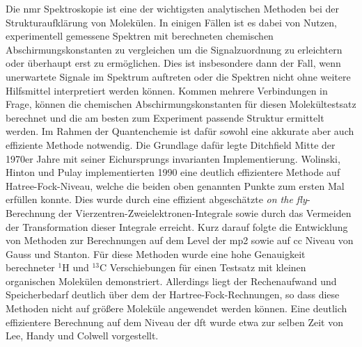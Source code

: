 Die \ac{nmr} Spektroskopie ist eine der wichtigsten analytischen Methoden bei der Strukturaufklärung von Molekülen. In einigen Fällen ist es dabei von Nutzen, experimentell gemessene Spektren mit berechneten chemischen Abschirmungskonstanten zu vergleichen um die Signalzuordnung zu erleichtern oder überhaupt erst zu ermöglichen. Dies ist insbesondere dann der Fall, wenn unerwartete Signale im Spektrum auftreten oder die Spektren nicht ohne weitere Hilfsmittel interpretiert werden können. Kommen mehrere Verbindungen in Frage, können die chemischen Abschirmungskonstanten für diesen Molekültestsatz berechnet und die am besten zum Experiment passende Struktur ermittelt werden. Im Rahmen der Quantenchemie ist dafür sowohl eine akkurate aber auch effiziente Methode notwendig. Die Grundlage dafür legte Ditchfield\supercite{ditchfield1974self} Mitte der 1970er Jahre mit seiner Eichursprungs invarianten Implementierung. Wolinski, Hinton und Pulay\supercite{wolinski1990efficient} implementierten 1990 eine deutlich effizientere Methode auf Hatree-Fock-Niveau, welche die beiden oben genannten Punkte zum ersten Mal erfüllen konnte. Dies wurde durch eine effizient abgeschätzte \glqq \textit{on the fly}\grqq{}-Berechnung der Vierzentren-Zweielektronen-Integrale sowie durch das Vermeiden der Transformation dieser Integrale erreicht. Kurz darauf folgte die Entwicklung von Methoden zur Berechnungen auf dem Level der \ac{mp2}\supercite{gauss1992calculation} sowie auf \ac{cc}\supercite{gauss1995gauge} Niveau von Gauss und Stanton. Für diese Methoden wurde eine hohe Genauigkeit berechneter $^1$H und $^{13}$C Verschiebungen für einen Testsatz mit kleinen organischen Molekülen demonstriert. Allerdings liegt der Rechenaufwand und Speicherbedarf deutlich über dem der Hartree-Fock-Rechnungen, so dass diese Methoden nicht auf größere Moleküle angewendet werden können. Eine deutlich effizientere Berechnung auf dem Niveau der \ac{dft} wurde etwa zur selben Zeit von Lee, Handy und Colwell\supercite{lee1995density} vorgestellt. 

